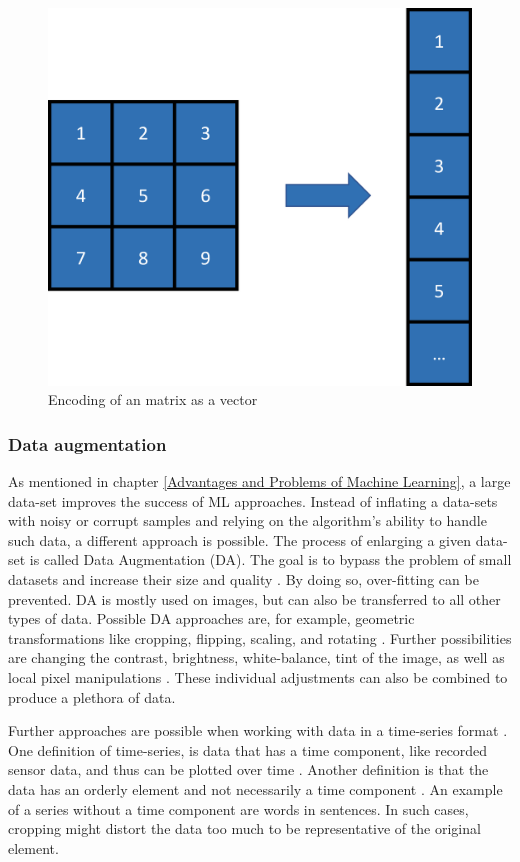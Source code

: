 \begin{figure}[H]
	\centering
	\includegraphics[width=0.455\linewidth]{IMGs/encoding.png}
	\caption{Encoding of an matrix as a vector}
	\label{fig:encoding}
\end{figure}

 
\subsubsection*{Data augmentation}\label{DAUG}
As mentioned in chapter \ref{Advantages and Problems of Machine Learning}, a large data-set improves the success of ML approaches. Instead of inflating a data-sets with noisy or corrupt samples and relying on the algorithm's ability to handle such data, a different approach is possible. The process of enlarging a given data-set is called Data Augmentation (DA). The goal is to bypass the problem of small datasets and increase their size and quality \cite{Shorten}. By doing so, over-fitting can be prevented. DA is mostly used on images, but can also be transferred to all other types of data. Possible DA approaches are, for example, geometric transformations like cropping, flipping, scaling, and rotating \cite{Taylor}. Further possibilities are changing the contrast, brightness, white-balance, tint of the image, as well as local pixel manipulations \cite{Mikolajczyk}. These individual adjustments can also be combined to produce a plethora of data.

Further approaches are possible when working with data in a time-series format \cite{Bandara, Wen}. One definition of time-series, is data that has a time component, like recorded sensor data, and thus can be plotted over time \cite{Hamilton}. Another definition is that the data has an orderly element and not necessarily a time component \cite{Iwana}. An example of a series without a time component are words in sentences. In such cases, cropping might distort the data too much to be representative of the original element.

